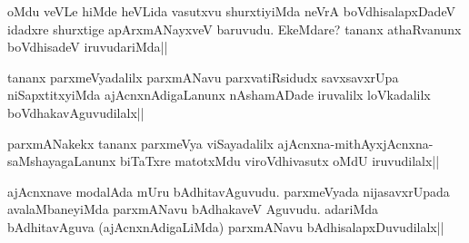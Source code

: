 \begin{artha} 
oMdu veVLe hiMde heVLida vasutxvu shurxtiyiMda neVrA boVdhisalapxDadeV 
idadxre shurxtige apArxmANayxveV baruvudu. EkeMdare? tananx 
athaRvanunx boVdhisadeV iruvudariMda||
\end{artha}


\begin{artha} 
tananx parxmeVyadalilx parxmANavu parxvatiRsidudx savxsavxrUpa 
niSapxtitxyiMda ajAcnxnAdigaLanunx nAshamADade iruvalilx loVkadalilx 
boVdhakavAguvudilalx||
\end{artha}


\begin{artha} 
parxmANakekx tananx parxmeVya viSayadalilx 
ajAcnxna-mithAyxjAcnxna-saMshayagaLanunx biTaTxre matotxMdu 
viroVdhivasutx oMdU iruvudilalx||
\end{artha}


\begin{artha} 
ajAcnxnave modalAda mUru bAdhitavAguvudu. parxmeVyada nijasavxrUpada 
avalaMbaneyiMda parxmANavu bAdhakaveV Aguvudu. adariMda bAdhitavAguva 
(ajAcnxnAdigaLiMda) parxmANavu bAdhisalapxDuvudilalx||
\end{artha}
